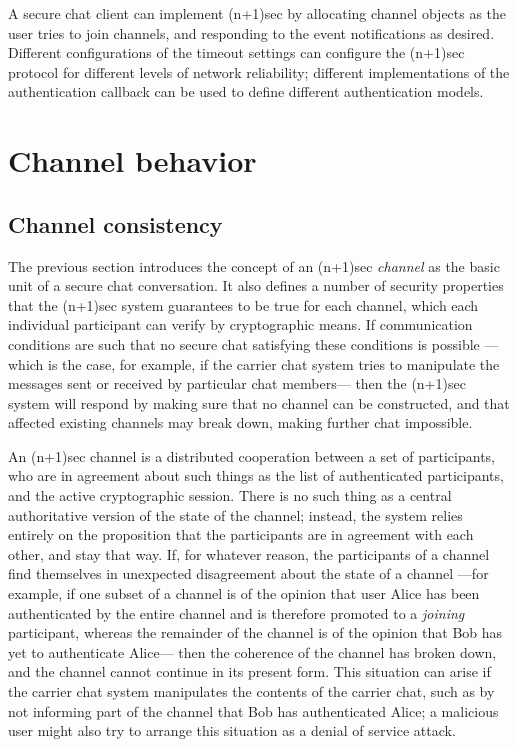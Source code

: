 \documentclass{article}
\begin{document}
A secure chat client can implement (n+1)sec by allocating channel objects as the user tries to join channels, and responding to the event notifications as desired.
Different configurations of the timeout settings can configure the (n+1)sec protocol for different levels of network reliability; different implementations of the authentication callback can be used to define different authentication models.

\section{Channel behavior}
\label{sec:channel-behavior}

\subsection{Channel consistency}
\label{sec:channel-behavior/channel-consistency}
The previous section introduces the concept of an (n+1)sec \emph{channel} as the basic unit of a secure chat conversation.
It also defines a number of security properties that the (n+1)sec system guarantees to be true for each channel, which each individual participant can verify by cryptographic means.
If communication conditions are such that no secure chat satisfying these conditions is possible ---which is the case, for example, if the carrier chat system tries to manipulate the messages sent or received by particular chat members--- then the (n+1)sec system will respond by making sure that no channel can be constructed, and that affected existing channels may break down, making further chat impossible.

An (n+1)sec channel is a distributed cooperation between a set of participants, who are in agreement about such things as the list of authenticated participants, and the active cryptographic session.
There is no such thing as a central authoritative version of the state of the channel; instead, the system relies entirely on the proposition that the participants are in agreement with each other, and stay that way.
If, for whatever reason, the participants of a channel find themselves in unexpected disagreement about the state of a channel ---for example, if one subset of a channel is of the opinion that user Alice has been authenticated by the entire channel and is therefore promoted to a \emph{joining} participant, whereas the remainder of the channel is of the opinion that Bob has yet to authenticate Alice--- then the coherence of the channel has broken down, and the channel cannot continue in its present form.
This situation can arise if the carrier chat system manipulates the contents of the carrier chat, such as by not informing part of the channel that Bob has authenticated Alice; a malicious user might also try to arrange this situation as a denial of service attack.
\end{document}
